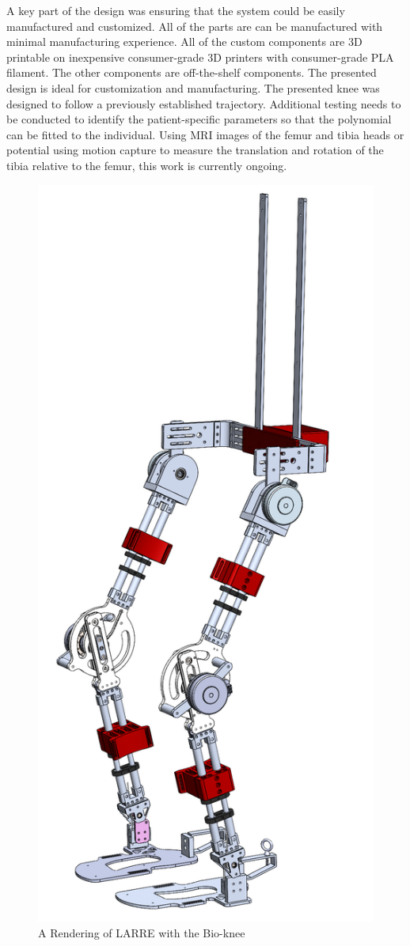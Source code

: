 A key part of the design was ensuring that the system could be easily manufactured and customized. All of the parts are can be manufactured with minimal manufacturing experience. All of the custom components are 3D printable on inexpensive consumer-grade 3D printers with consumer-grade PLA filament. The other components are off-the-shelf components. The presented design is ideal for customization and manufacturing. The presented knee was designed to follow a previously established trajectory. Additional testing needs to be conducted to identify the patient-specific parameters so that the polynomial can be fitted to the individual. Using MRI images of the femur and tibia heads or potential using motion capture to measure the translation and rotation of the tibia relative to the femur, this work is currently ongoing. 

\begin{figure}
    \centering
    \includegraphics[scale=0.15]{images/mech_design/exo_with_bioknee.png}
    \caption[Rendering of LARRE with the Bio-Knee]{A Rendering of LARRE with the Bio-knee}
    \label{fig:LARRBio-Knee}
\end{figure}
